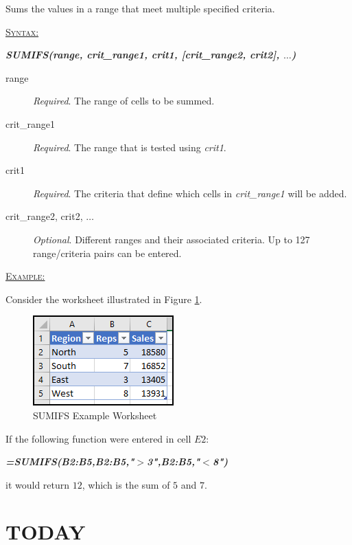 Sums the values in a range that meet multiple specified criteria.

\begin{addmargin}[1cm]{0cm}
	
	\medskip
	\underline{\textsc{Syntax:}}
	\medskip
	
	{\color{Syntax}
		\noindent\textbf{\textit{SUMIFS(range, crit\_range1, crit1, [crit\_range2, crit2], $\ldots$)}}
	}
	
	\begin{description}
		\item[range] \textit{Required}. The range of cells to be summed. 
		\item[crit\_range1] \textit{Required}. The range that is tested using \textit{crit1}.
		\item[crit1] \textit{Required}. The criteria that define which cells in \textit{crit\_range1} will be added.
		\item[crit\_range2, crit2, $\ldots$] \textit{Optional}. Different ranges and their associated criteria. Up to 127 range/criteria pairs can be entered.
	\end{description}

	\medskip
	\noindent\underline{\textsc{Example:}}
	\medskip
	
	\noindent Consider the worksheet illustrated in Figure \ref{apa:sfs}.
	
	\begin{figure}[H]
		\centering
		\includegraphics[width=\maxwidth{.45\linewidth}]{gfx/apa_fig01}
		\caption{SUMIFS Example Worksheet}
		\label{apa:sfs}
	\end{figure}
	
	\noindent If the following function were entered in cell $ E2 $:
	
	{\color{Syntax}
		\textit{\textbf{=SUMIFS(B2:B5,B2:B5,"$ > $3",B2:B5,"$ < $8")}}
	}
	
	\noindent it would return $ 12 $, which is the sum of $ 5 $ and $ 7 $.

\end{addmargin}
 
\section{TODAY}


